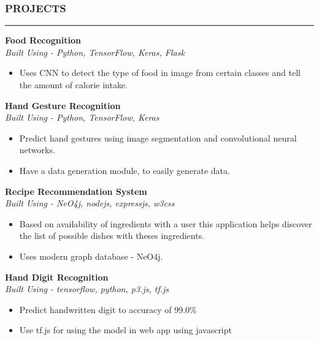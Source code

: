 \documentclass[a4paper]{article}
\begin{document}
\subsubsection*{PROJECTS}
\hrule
\vspace{10pt}

\noindent
\textbf{Food Recognition} \\
\textit{Built Using - Python, TensorFlow, Keras, Flask}
\begin{itemize} [leftmargin=*, nosep]
    \item Uses CNN to detect the type of food in image from certain classes and tell the amount of calorie intake.
\end{itemize}

\vspace{10pt}
\noindent
\textbf{Hand Gesture Recognition} \\
\textit{Built Using - Python, TensorFlow, Keras}
\begin{itemize} [leftmargin=*, nosep]
    \item Predict hand gestures using image segmentation and convolutional neural networks.
    \item Have a data generation module, to easily generate data.
\end{itemize}

\vspace{10pt}
\noindent
\textbf{Recipe Recommendation System} \\
\textit{Built Using - NeO4j, nodejs, expressjs, w3css}
\begin{itemize}[leftmargin=*, nosep]
    \item Based on availability of ingredients with a user this application
          helps discover the list of possible dishes with theses ingredients.
    \item Uses modern graph database - NeO4j.
\end{itemize}

\vspace{10pt}
\noindent
\textbf{Hand Digit Recognition} \\
\textit{Built Using - tensorflow, python, p3.js, tf.js}
\begin{itemize}[leftmargin=*, nosep]
    \item Predict handwritten digit to accuracy of 99.0\%
    \item Use tf.js for using the model in web app using javascript
\end{itemize}
\end{document}
